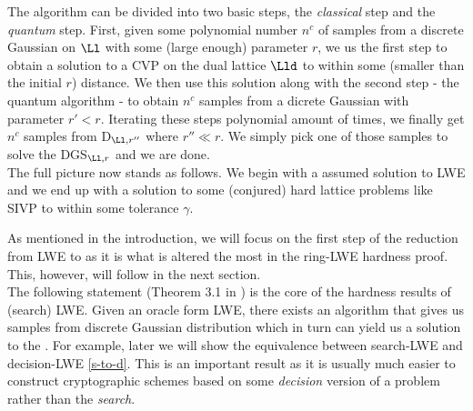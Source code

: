 The algorithm can be divided into two basic steps, the \textit{classical} step and the \textit{quantum} step. First, given some polynomial number $n^c$ of samples from a discrete Gaussian on $\Ll$ with some (large enough) parameter $r$, we us the first step to obtain a solution to a CVP on the dual lattice $\Lld$ to within some (smaller than the initial $r$) distance. We then use this solution along with the second step - the quantum algorithm - to obtain $n^c$ samples from a dicrete Gaussian with parameter $r' < r$. Iterating these steps polynomial amount of times, we finally get $n^c$ samples from D$_{\Ll, r''}$ where $r'' \ll r$. We simply pick one of those samples to solve the DGS$_{\Ll, r}$ and we are done.
\\
The full picture now stands as follows. We begin with a assumed solution to LWE and we end up with a solution to some (conjured) hard lattice problems like SIVP to within some tolerance $\gamma$.
\begin{center}
\end{center}
As mentioned in the introduction, we will focus on the first step of the reduction from LWE to  as it is what is altered the most in the ring-LWE hardness proof. This, however, will follow in the next section. \\

The following statement (Theorem 3.1 in \cite{regev}) is the core of the hardness results of (search) LWE. Given an oracle form LWE, there exists an algorithm that gives us samples from discrete Gaussian distribution which in turn can yield us a solution to the . For example, later we will show the equivalence between search-LWE and decision-LWE \ref{s-to-d}. This is an important result as it is usually much easier to construct cryptographic schemes based on some \textit{decision} version of a problem rather than the \textit{search}.

